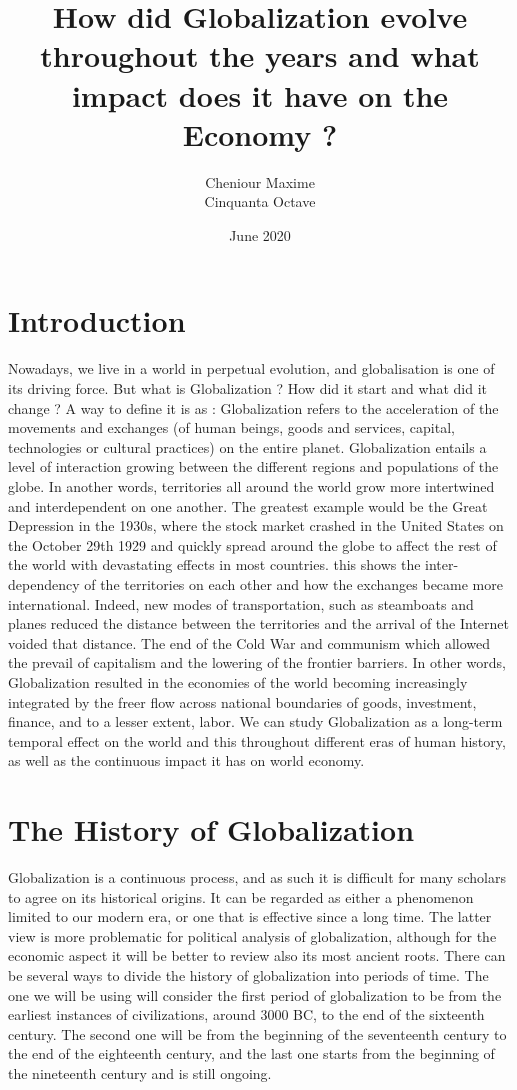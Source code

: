 \documentclass[12pt]{article}
\title{How did Globalization evolve throughout the years and what impact does it have on the Economy ?}
\author{Cheniour Maxime \\ Cinquanta Octave}
\date{June 2020}
\begin{document}
\maketitle

\tableofcontents

\section{Introduction}
Nowadays, we live in a world in perpetual evolution, and globalisation is one of its driving force. But what is Globalization ? How did it start and what did it change ? A way to define it is as : Globalization refers to the acceleration of the movements and exchanges (of human beings, goods and services, capital, technologies or cultural practices) on the entire planet. Globalization entails a level of interaction growing between the different regions and populations of the globe. In another words, territories all around the world grow more intertwined and interdependent on one another. The greatest example would be the Great Depression in the 1930s, where the stock market crashed in the United States on the October 29th 1929 and quickly spread around the globe to affect the rest of the world with devastating effects in most countries. this shows the inter-dependency of the territories on each other and how the exchanges became more international. Indeed, new modes of transportation, such as steamboats and planes reduced the distance between the territories and the arrival of the Internet voided that distance. The end of the Cold War and communism which allowed the prevail of capitalism and the lowering of the frontier barriers. In other words, Globalization resulted in the economies of the world becoming increasingly integrated by the freer flow across national boundaries of goods, investment, finance, and to a lesser extent, labor. We can study Globalization as a long-term temporal effect on the world and this throughout different eras of human history, as well as the continuous impact it has on world economy.

\section{The History of Globalization}

Globalization is a continuous process, and as such it is difficult for many scholars to agree on its historical origins. It can be regarded as either a phenomenon limited to our modern era, or one that is effective since a long time. The latter view is more problematic for political analysis of globalization, although for the economic aspect it will be better to review also its most ancient roots. There can be several ways to divide the history of globalization into periods of time. The one we will be using will consider the first period of globalization to be from the earliest instances of civilizations, around 3000 BC, to the end of the sixteenth century. The second one will be from the beginning of the seventeenth century to the end of the eighteenth century, and the last one starts from the beginning of the nineteenth century and is still ongoing.
\end{document}
